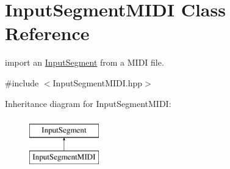 \hypertarget{classInputSegmentMIDI}{}\section{Input\+Segment\+M\+I\+DI Class Reference}
\label{classInputSegmentMIDI}


import an \mbox{\hyperlink{classInputSegment}{Input\+Segment}} from a M\+I\+DI file.  




{\ttfamily \#include $<$Input\+Segment\+M\+I\+D\+I.\+hpp$>$}

Inheritance diagram for Input\+Segment\+M\+I\+DI\+:\begin{figure}[H]
\begin{center}
\leavevmode
\includegraphics[height=2.000000cm]{classInputSegmentMIDI}
\end{center}
\end{figure}
